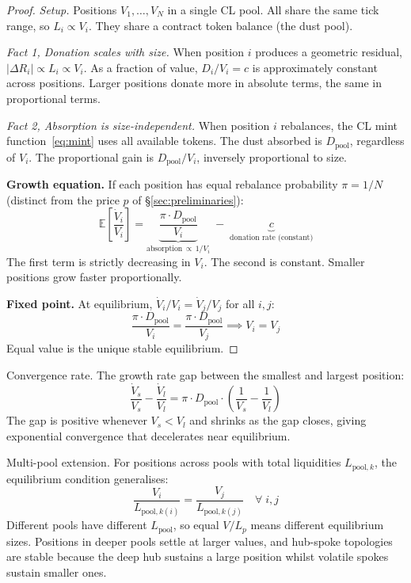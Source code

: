 \documentclass[11pt,a4paper]{article}
\begin{document}
\begin{proof}
\emph{Setup.} Positions $V_1, \ldots, V_N$ in a single CL pool. All share the same tick range, so $L_i \propto V_i$. They share a contract token balance (the dust pool).

\emph{Fact 1, Donation scales with size.} When position $i$ produces a geometric residual, $|\Delta R_i| \propto L_i \propto V_i$. As a fraction of value, $D_i/V_i = c$ is approximately constant across positions. Larger positions donate more in absolute terms, the same in proportional terms.

\emph{Fact 2, Absorption is size-independent.} When position $i$ rebalances, the CL mint function~\eqref{eq:mint} uses all available tokens. The dust absorbed is $D_{\text{pool}}$, regardless of $V_i$. The proportional gain is $D_{\text{pool}}/V_i$, inversely proportional to size.

\textbf{Growth equation.} If each position has equal rebalance probability $\pi = 1/N$ (distinct from the price $p$ of \S\ref{sec:preliminaries}):
\begin{equation}\label{eq:growth}
\mathbb{E}\!\left[\frac{\dot{V}_i}{V_i}\right] = \underbrace{\frac{\pi \cdot D_{\text{pool}}}{V_i}}_{\text{absorption}\,\propto\,1/V_i} \;-\; \underbrace{c}_{\text{donation rate (constant)}}
\end{equation}
The first term is strictly decreasing in $V_i$. The second is constant. Smaller positions grow faster proportionally.

\textbf{Fixed point.} At equilibrium, $\dot{V}_i/V_i = \dot{V}_j/V_j$ for all $i, j$:
\begin{equation}\label{eq:fixedpoint}
\frac{\pi \cdot D_{\text{pool}}}{V_i} = \frac{\pi \cdot D_{\text{pool}}}{V_j} \implies V_i = V_j
\end{equation}
Equal value is the unique stable equilibrium.
\end{proof}

Convergence rate. The growth rate gap between the smallest and largest position:
\begin{equation}\label{eq:convergence-rate}
\frac{\dot{V}_s}{V_s} - \frac{\dot{V}_l}{V_l} = \pi \cdot D_{\text{pool}} \cdot \left(\frac{1}{V_s} - \frac{1}{V_l}\right)
\end{equation}
The gap is positive whenever $V_s < V_l$ and shrinks as the gap closes, giving exponential convergence that decelerates near equilibrium.

Multi-pool extension. For positions across pools with total liquidities $L_{\text{pool},k}$, the equilibrium condition generalises:
\begin{equation}\label{eq:multipool}
\frac{V_i}{L_{\text{pool},k(i)}} = \frac{V_j}{L_{\text{pool},k(j)}} \quad \forall \; i, j
\end{equation}
Different pools have different $L_{\text{pool}}$, so equal $V/L_p$ means different equilibrium sizes. Positions in deeper pools settle at larger values, and hub-spoke topologies are stable because the deep hub sustains a large position whilst volatile spokes sustain smaller ones.
\end{document}

